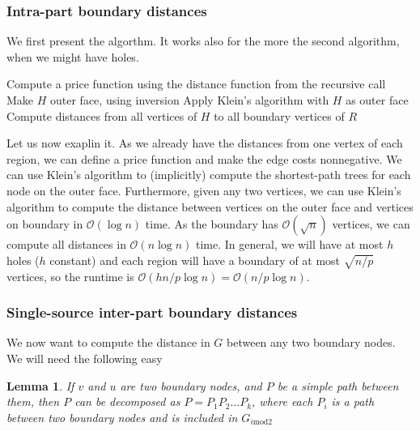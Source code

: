 \documentclass[11pt]{article}
\newtheorem{lemma}[theorem]{Lemma}
\begin{document}
\subsubsection{Intra-part boundary distances}
\label{sec: intra-part boundary distances}

We first present the algorthm. It works also for the more the second algorithm, when we might have holes.

\begin{algorithm}[!htb]
    \label{alg:region}
    \begin{algorithmic}
            \State Compute a price function using the distance function from the recursive call
                \State Make $H$ outer face, using inversion
                \State Apply Klein's algorithm with $H$ as outer face
                \State Compute distances from all vertices of $H$ to all boundary vertices of $R$
            \EndFor
        \EndFor
    \end{algorithmic}
\end{algorithm}

Let us now exaplin it. As we already have the distances from one vertex of each region, we can define a price function and make the edge costs nonnegative. We can use Klein's algorithm to (implicitly) compute the shortest-path trees for each node on the outer face. Furthermore, given any two vertices, we can use Klein's algorithm to compute the distance between vertices on the outer face and vertices on boundary in $\mathcal{O}(\log n)$ time. As the boundary has $\mathcal{O}(\sqrt{n})$ vertices, we can compute all distances in $\mathcal{O}(n\log n)$ time. In general, we will have at most $h$ holes ($h$ constant) and each region will have a boundary of at most $\sqrt{n/p}$ vertices, so the runtime is $\mathcal{O}(hn/p\log n) = \mathcal{O}(n/p\log n)$.

\subsubsection{Single-source inter-part boundary distances}

We now want to compute the distance in $G$ between any two boundary nodes. We will need the following easy

\begin{lemma}
If $v$ and $u$ are two boundary nodes, and $P$ be a simple path between them, then $P$ can be decomposed as $P=P_1P_2\ldots P_k$, where each $P_i$ is a path between two boundary nodes and is included in $G_{i \text{mod} 2}$
\end{lemma}
\end{document}
